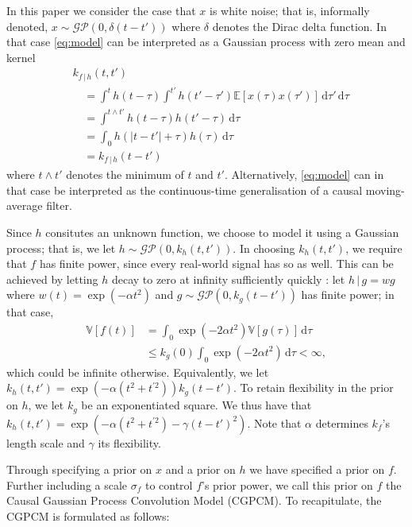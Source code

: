 \documentclass{article}
\newcommand{\id}[1]{\, \mathrm{d} #1}     %
\newcommand{\cond}{\, | \,}               %
\begin{document}
In this paper we consider the case that $x$ is white noise; that is, informally denoted, $x \sim \mathcal{GP}(0,\delta(t-t'))$ where $\delta$ denotes the Dirac delta function. In that case \cref{eq:model} can be interpreted as a Gaussian process with zero mean and kernel
\begin{align}
    &k_{f\cond h}(t,t')\nonumber \\
    &\quad= \int^t h(t- \tau)\int^{t'}h(t'- \tau')
        \mathbb{E}[ x(\tau) x(\tau')]\id{\tau'} \id{\tau} \nonumber \\
    &\quad= \int^{t \land t'} h(t - \tau) h(t' - \tau) \id{\tau} \nonumber \\
    &\quad= \int_0 h(|t - t'| + \tau)h(\tau) \id{\tau} \label{eq:kernel} \\
    &\quad= k_{f\cond h}(t-t') \nonumber
\end{align}
where $t \land t'$ denotes the minimum of $t$ and $t'$. Alternatively, \cref{eq:model} can in that case be interpreted as the continuous-time generalisation of a causal moving-average filter.

Since $h$ consitutes an unknown function, we choose to model it using a Gaussian process; that is, we let $h \sim \mathcal{GP}(0,k_h(t,t'))$. In choosing $k_h(t,t')$, we require that $f$ has finite power, since every real-world signal has so as well. This can be achieved by letting $h$ decay to zero at infinity sufficiently quickly \cite{Tobar:2015:Learning_Stationary}: let $h\cond g = w g$ where $w(t)= \exp(- \alpha t^2)$ and $g \sim \mathcal{GP}(0,k_g(t-t'))$ has finite power; in that case,
\begin{align*}
    \mathbb{V}[f(t)]
    &= \int_{0}\exp(-2 \alpha t^2)\mathbb{V}[g(\tau)]\id{\tau} \\
    &\le k_g(0) \int_0 \exp(- 2 \alpha t^2) \id{\tau} < \infty,
\end{align*}
which could be infinite otherwise.
Equivalently, we let $k_h(t,t')=\exp(- \alpha (t^2 + t^{\prime 2}))k_g(t-t')$. To retain flexibility in the prior on $h$, we let $k_g$ be an exponentiated square. We thus have that $k_h(t,t')=\exp(- \alpha (t^2 + t^{\prime 2}) - \gamma(t-t')^2)$. Note that $\alpha$ determines $k_f$'s length scale and $\gamma$ its flexibility.

Through specifying a prior on $x$ and a prior on $h$ we have specified a prior on $f$. Further including a scale $\sigma_f$ to control $f$'s prior power, we call this prior on $f$ the Causal Gaussian Process Convolution Model (CGPCM). To recapitulate, the CGPCM is formulated as follows:
\end{document}
